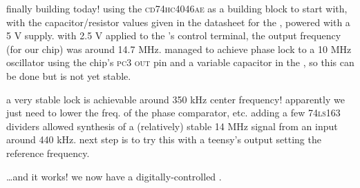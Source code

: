 finally building today! using the \textsc{cd74hc4046ae} as a \pll building
block to start with, with the capacitor/resistor values given in the datasheet
for the \vco, powered with a 5 V supply. with 2.5 V applied to the \vco's
control terminal, the output frequency (for our chip) was around 14.7 MHz.
managed to achieve phase lock to a 10 MHz oscillator using the chip's
\textsc{pc3 out} pin and a variable capacitor in the \vco, so this can be done
but is not yet stable.

a very stable lock is achievable around 350 kHz center frequency! apparently we
just need to lower the freq. of the phase comparator, etc. adding a few
\textsc{74ls163} dividers allowed synthesis of a (relatively) stable 14 MHz
signal from an input around 440 kHz. next step is to try this \pll with a
teensy's \pwm output setting the reference frequency.

\ldots and it works! we now have a digitally-controlled \pll.
